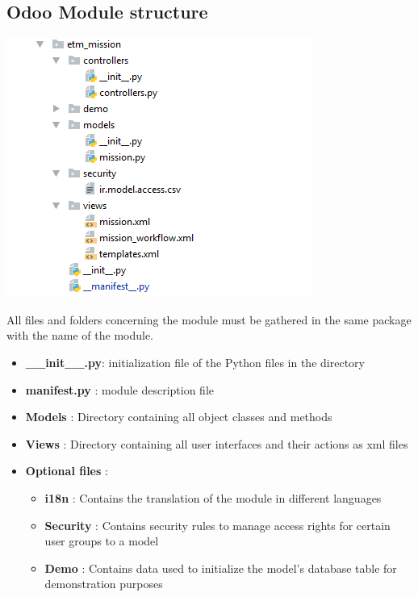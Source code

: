 \subsection*{Odoo Module structure}
       \begin{center}
         \includegraphics[scale=1]{img/project_Structure.png}\\
       \end{center}
       All files and folders concerning the module must be gathered in the same package with the name of the module.
     \begin{itemize}  
\item \textbf{\_\_init\_\_.py}: initialization file of the Python files in the directory
\item \textbf{manifest.py }: module description file

         \item\textbf{Models }: Directory containing all object classes and methods

         
\item\textbf{Views }: Directory containing all user interfaces and their actions as xml files\\
\item\textbf{Optional files }:
        \begin{itemize}
        \item\textbf{i18n }: Contains the translation of the module in different languages
        \item\textbf{Security }: Contains security rules to manage access rights for certain user groups to a model
        \item\textbf{Demo }: Contains data used to initialize the model's database table for demonstration purposes
         \end{itemize}
    \end{itemize}
    
